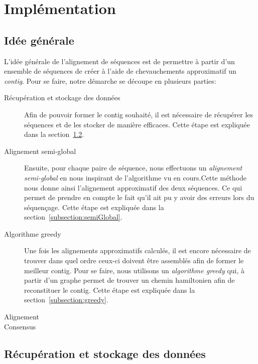 \section{Implémentation}

\subsection{Idée générale}

	L'idée générale de l'alignement de séquences est de permettre à partir d'un ensemble de séquences de créer à l'aide de chevauchements approximatif un \emph{contig}. Pour se faire, notre démarche se découpe en plusieurs parties:
	
	\begin{description}
		\item[Récupération et stockage des données] Afin de pouvoir former le contig souhaité, il est nécessaire de récupérer les séquences et de les stocker de manière efficaces. Cette étape est expliquée dans la section~\ref{subsection:recStock}.
		
		\item[Alignement semi-global] Ensuite, pour chaque paire de séquence, nous effectuons un \emph{alignement semi-global} en nous inspirant de l'algorithme vu en cours.Cette méthode nous donne ainsi l'alignement approximatif des deux séquences. Ce qui permet de prendre en compte le fait qu'il ait pu y avoir des erreurs lors du séquençage. Cette étape est expliquée dans la section~\ref{subsection:semiGlobal}.
		
		\item[Algorithme greedy] Une fois les alignements approximatifs calculés, il est encore nécessaire de trouver dans quel ordre ceux-ci doivent être assemblés afin de former le meilleur contig. Pour se faire, nous utilisons un \emph{algorithme greedy} qui, à partir d'un graphe permet de trouver un chemin hamiltonien afin de reconstituer le contig. Cette étape est expliquée dans la section~\ref{subsection:greedy}.
		
		\item[Alignement]
		
		\item[Consensus]
		
	\end{description}

\subsection{Récupération et stockage des données}
\label{subsection:recStock}

